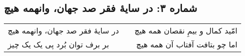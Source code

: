 \begin{center}
\section*{شماره ۳: در سایۀ فقر صد جهان، وانهمه هیچ}
\label{sec:003}
\begin{longtable}{l p{0.5cm} r}
در سایهٔ فقر صد جهان، وانهمه هیچ
&&
امّید کمال و بیمِ نقصان همه هیچ
\\
بر برف توان بُرد پی یک یک چیز
&&
اما چو بتافت آفتاب آن همه هیچ
\\
\end{longtable}
\end{center}

